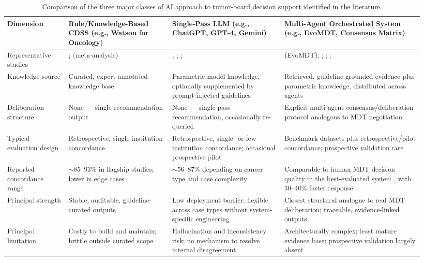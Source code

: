 \documentclass[acmsmall,screen=true,review=false,nonacm=true]{acmart}
\begin{document}
\begin{table}[t]
\centering
\caption{Comparison of the three major classes of AI approach to tumor-board decision support identified in the literature.}
\label{tab:comparison}
\small
\begin{tabular}{P{2.2cm}P{3.3cm}P{3.5cm}P{3.5cm}}
\toprule
\textbf{Dimension} & \textbf{Rule/Knowledge-Based CDSS} (e.g., Watson for Oncology) & \textbf{Single-Pass LLM} (e.g., ChatGPT, GPT-4, Gemini) & \textbf{Multi-Agent Orchestrated System} (e.g., EvoMDT, Consensus Matrix) \\
\midrule
Representative studies & \citet{somashekhar2018}; \citet{jie2021} (meta-analysis) & \citet{ismayilov2025}; \citet{chatziisaak2025}; \citet{ciulli2026}; \citet{aliyev2026} & \citet{liu2026} (EvoMDT); \citet{han2025}; \citet{saenz2026}; \citet{wang2025jco}; \citet{kuerbanjiang2025} \\
Knowledge source & Curated, expert-annotated knowledge base & Parametric model knowledge, optionally supplemented by prompt-injected guidelines & Retrieved, guideline-grounded evidence plus parametric knowledge, distributed across agents \\
Deliberation structure & None --- single recommendation output & None --- single-pass recommendation, occasionally re-queried & Explicit multi-agent consensus/deliberation protocol analogous to MDT negotiation \\
Typical evaluation design & Retrospective, single-institution concordance & Retrospective, single- or few-institution concordance; occasional prospective pilot & Benchmark datasets plus retrospective/pilot concordance; prospective validation rare \\
Reported concordance range & $\sim$85--93\% in flagship studies; lower in edge cases \citep{somashekhar2018} & $\sim$56--87\% depending on cancer type and case complexity \citep{aliyev2026,chatziisaak2025} & Comparable to human MDT decision quality in the best-evaluated system \citep{liu2026}, with 30--40\% faster response \\
Principal strength & Stable, auditable, guideline-curated outputs & Low deployment barrier; flexible across case types without system-specific engineering & Closest structural analogue to real MDT deliberation; traceable, evidence-linked outputs \\
Principal limitation & Costly to build and maintain; brittle outside curated scope \citep{wu2026} & Hallucination and inconsistency risk; no mechanism to resolve internal disagreement & Architecturally complex; least mature evidence base; prospective validation largely absent \\
\bottomrule
\end{tabular}
\end{table}
\end{document}
